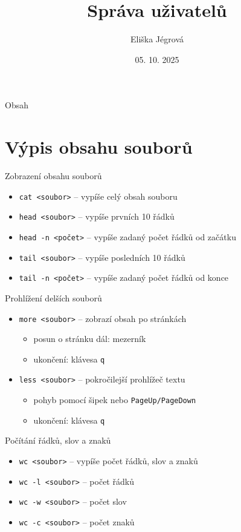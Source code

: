 \documentclass{beamer}
\title{Správa uživatelů}
\author{Eliška Jégrová}
\date{05. 10. 2025}
\begin{document}
	
	\frame{\titlepage}
	
	\begin{frame}{Obsah}
		\tableofcontents
	\end{frame}
	
	
\section{Výpis obsahu souborů}

\begin{frame}{Zobrazení obsahu souborů}
	\begin{itemize}
		\item \texttt{cat <soubor>} – vypíše celý obsah souboru
		\item \texttt{head <soubor>} – vypíše prvních 10 řádků
		\item \texttt{head -n <počet>} – vypíše zadaný počet řádků od začátku
		\item \texttt{tail <soubor>} – vypíše posledních 10 řádků
		\item \texttt{tail -n <počet>} – vypíše zadaný počet řádků od konce
	\end{itemize}
\end{frame}

\begin{frame}{Prohlížení delších souborů}
	\begin{itemize}
		\item \texttt{more <soubor>} – zobrazí obsah po stránkách
		\begin{itemize}
			\item posun o stránku dál: mezerník
			\item ukončení: klávesa \texttt{q}
		\end{itemize}
		\item \texttt{less <soubor>} – pokročilejší prohlížeč textu
		\begin{itemize}
			\item pohyb pomocí šipek nebo \texttt{PageUp/PageDown}
			\item ukončení: klávesa \texttt{q}
		\end{itemize}
	\end{itemize}
\end{frame}

\begin{frame}{Počítání řádků, slov a znaků}
	\begin{itemize}
		\item \texttt{wc <soubor>} – vypíše počet řádků, slov a znaků
		\item \texttt{wc -l <soubor>} – počet řádků
		\item \texttt{wc -w <soubor>} – počet slov
		\item \texttt{wc -c <soubor>} – počet znaků
	\end{itemize}
\end{frame}
\end{document}
